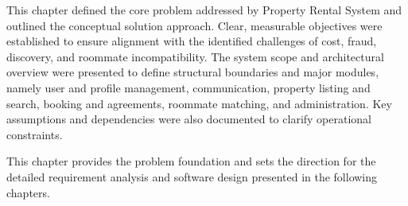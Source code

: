 This chapter defined the core problem addressed by Property Rental System and outlined the
conceptual solution approach. Clear, measurable objectives were established to
ensure alignment with the identified challenges of cost, fraud, discovery, and
roommate incompatibility. The system scope and architectural overview were
presented to define structural boundaries and major modules, namely user and
profile management, communication, property listing and search, booking and
agreements, roommate matching, and administration. Key assumptions and
dependencies were also documented to clarify operational constraints.

This chapter provides the problem foundation and sets the direction for the
detailed requirement analysis and software design presented in the following chapters.
